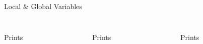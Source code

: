         \begin{frame}{Local \& Global Variables}
            \begin{columns}
                \begin{column}{0.33\textwidth}
                    \inputminted[frame=single,framesep=2pt, lastline=15]{python3}{code-examples/var4.py}                    
                    \pause
                    Prints
                \end{column}
                \begin{column}{0.33\textwidth}
                    \pause
                    \inputminted[frame=single,framesep=2pt, lastline=15]{python3}{code-examples/var5.py}                    
                    \pause
                    Prints
                \end{column}
                \begin{column}{0.33\textwidth}
                    \pause
                    \inputminted[frame=single,framesep=2pt, lastline=15]{python3}{code-examples/var6.py}                    
                    \pause
                    Prints
                \end{column}
            \end{columns}
        \end{frame}

